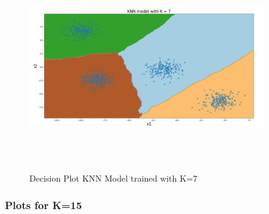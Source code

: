 \begin{figure}[!ht]
    \centering
    \includegraphics[height=3.5in,width=4in]{Dataset_1a/K_7_decision_plot.png}
    \caption{Decision Plot KNN Model trained with K=7}
    \label{fig:4}
\end{figure}

\newpage
\subsubsection{Plots for K=15}

